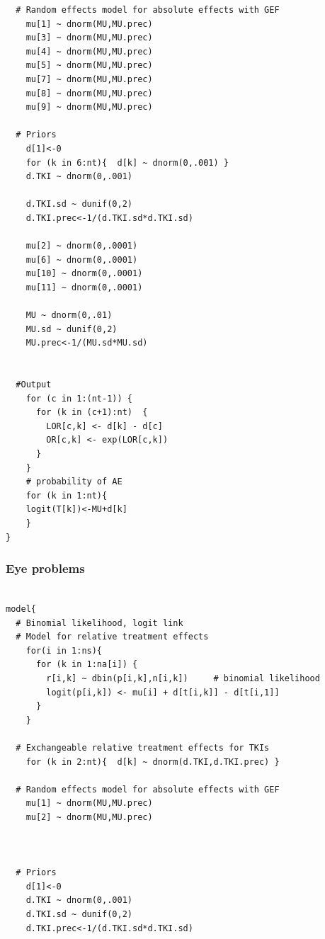 \documentclass[11pt,final,fleqn]{article}\usepackage[]{graphicx}\usepackage[]{color}
\theoremstyle{plain}
\begin{document}
\begin{appendices}
\begin{verbatim}
  # Random effects model for absolute effects with GEF
    mu[1] ~ dnorm(MU,MU.prec) 
    mu[3] ~ dnorm(MU,MU.prec)
    mu[4] ~ dnorm(MU,MU.prec)
    mu[5] ~ dnorm(MU,MU.prec) 
    mu[7] ~ dnorm(MU,MU.prec) 
    mu[8] ~ dnorm(MU,MU.prec) 
    mu[9] ~ dnorm(MU,MU.prec)    
       
  # Priors
    d[1]<-0                                      
    for (k in 6:nt){  d[k] ~ dnorm(0,.001) }     
    d.TKI ~ dnorm(0,.001)
    
    d.TKI.sd ~ dunif(0,2) 
    d.TKI.prec<-1/(d.TKI.sd*d.TKI.sd)
    
    mu[2] ~ dnorm(0,.0001)                     
    mu[6] ~ dnorm(0,.0001)                       
    mu[10] ~ dnorm(0,.0001)                       
    mu[11] ~ dnorm(0,.0001)                       
      
    MU ~ dnorm(0,.01)                         
    MU.sd ~ dunif(0,2) 
    MU.prec<-1/(MU.sd*MU.sd)
    
      
  #Output                                       
    for (c in 1:(nt-1)) {                        
      for (k in (c+1):nt)  { 
        LOR[c,k] <- d[k] - d[c]
        OR[c,k] <- exp(LOR[c,k])
      }  
    }
    # probability of AE
    for (k in 1:nt){ 
    logit(T[k])<-MU+d[k]
    }
}

\end{verbatim}

\subsubsection{Eye problems} 
\begin{verbatim} 

model{
  # Binomial likelihood, logit link
  # Model for relative treatment effects
    for(i in 1:ns){                  
      for (k in 1:na[i]) {               
        r[i,k] ~ dbin(p[i,k],n[i,k])     # binomial likelihood
        logit(p[i,k]) <- mu[i] + d[t[i,k]] - d[t[i,1]]  
      }
    }   
  
  # Exchangeable relative treatment effects for TKIs
    for (k in 2:nt){  d[k] ~ dnorm(d.TKI,d.TKI.prec) }
  
  # Random effects model for absolute effects with GEF
    mu[1] ~ dnorm(MU,MU.prec) 
    mu[2] ~ dnorm(MU,MU.prec) 
  
       
       
  # Priors
    d[1]<-0                                      
    d.TKI ~ dnorm(0,.001)
    d.TKI.sd ~ dunif(0,2) 
    d.TKI.prec<-1/(d.TKI.sd*d.TKI.sd)
      

\end{verbatim}
\end{appendices}
\end{document}
